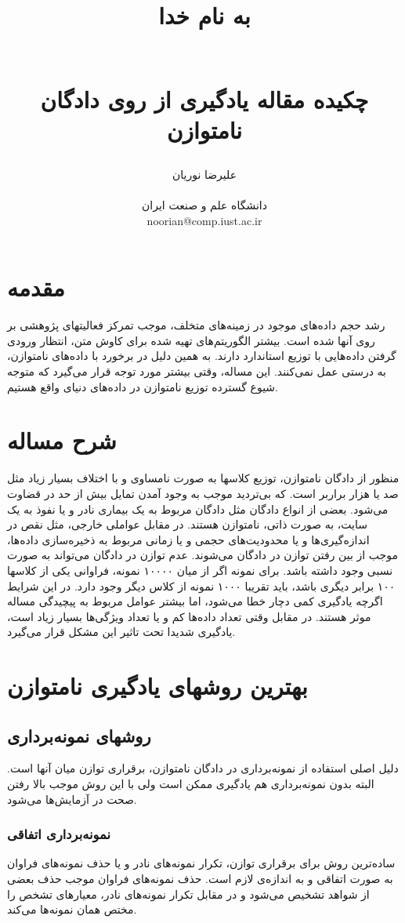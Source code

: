 \documentclass{article}
\title{ 
\begin{normalsize} به نام خدا \end{normalsize}
\\[7cm]
چکیده مقاله یادگیری از روی دادگان نامتوازن
\\[3cm]
}
\author{علیرضا نوریان
\\
\\ \small دانشگاه علم و صنعت ایران
\\ \small noorian@comp.iust.ac.ir
}
\begin{document}
\maketitle

\section{مقدمه}
رشد حجم داده‌های موجود در زمینه‌های متخلف، موجب تمرکز فعالیتهای پژوهشی بر روی آنها شده است. بیشتر الگوریتم‌های تهیه شده برای کاوش متن، انتظار ورودی گرفتن داده‌هایی با توزیع استاندارد دارند. به همین دلیل در برخورد با داده‌های نامتوازن، به درستی عمل نمی‌کنند. این مساله، وقتی بیشتر مورد توجه قرار می‌گیرد که متوجه شیوع گسترده توزیع نامتوازن در داده‌های دنیای واقع هستیم.
\section{شرح مساله}
منظور از دادگان نامتوازن، توزیع کلاسها به صورت نامساوی و با اختلاف بسیار  زیاد مثل صد یا هزار براربر است. که بی‌تردید موجب به وجود آمدن تمایل بیش از حد در قضاوت می‌شود. بعضی از انواع دادگان مثل دادگان مربوط به یک بیماری نادر و یا نفوذ به یک سایت، به صورت ذاتی، نامتوازن هستند. در مقابل عواملی خارجی، مثل نقص در اندازه‌گیری‌ها و یا محدودیت‌های حجمی و یا زمانی مربوط به ذخیره‌سازی داده‌ها، موجب از بین رفتن توازن در دادگان می‌شوند.
عدم توازن در دادگان می‌تواند به صورت نسبی وجود داشته باشد. برای نمونه اگر از میان ۱۰۰۰۰ نمونه، فراوانی یکی از کلاسها ۱۰۰ برابر دیگری باشد، باید تقریبا ۱۰۰۰ نمونه از کلاس دیگر وجود دارد. در این شرایط اگرچه یادگیری کمی دچار خطا می‌شود، اما بیشتر عوامل مربوط به پیچیدگی مساله موثر هستند. در مقابل وقتی تعداد داده‌ها کم و یا تعداد ویژگی‌ها بسیار زیاد است، یادگیری شدیدا تحت تاثیر این مشکل قرار می‌گیرد.
\section{بهترین روشهای یادگیری نامتوازن}

\subsection{روشهای نمونه‌برداری}
دلیل اصلی استفاده از نمونه‌برداری در دادگان نامتوازن، برقراری توازن میان آنها است. البته بدون نمونه‌برداری هم یادگیری ممکن است ولی با این روش موجب بالا رفتن صحت در آزمایش‌ها می‌شود.

\subsubsection{نمونه‌برداری اتفاقی}
ساده‌ترین روش برای برقراری توازن، تکرار نمونه‌های نادر و یا حذف نمونه‌های فراوان به صورت اتفاقی و به اندازه‌ی لازم است. حذف نمونه‌های فراوان موجب حذف بعضی از شواهد تشخیص می‌شود و در مقابل تکرار نمونه‌های نادر، معیارهای تشخص را مختص همان نمونه‌ها می‌کند.
\end{document}
